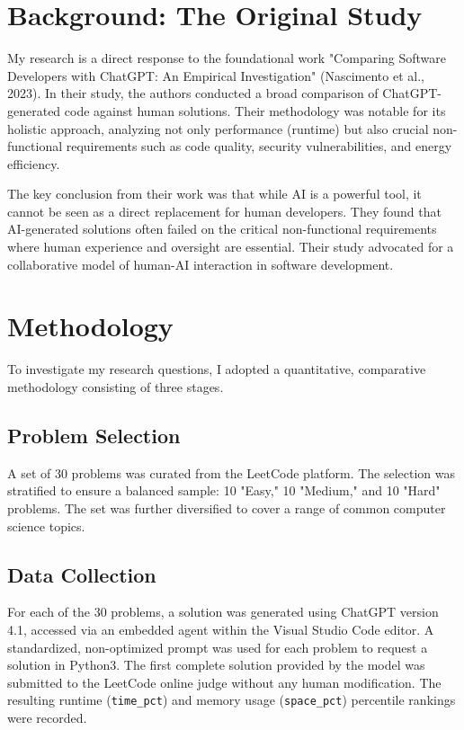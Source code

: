 \documentclass[12pt, a4paper]{article}
\begin{document}
\section{Background: The Original Study}

My research is a direct response to the foundational work "Comparing Software Developers with ChatGPT: An Empirical Investigation" (Nascimento et al., 2023). In their study, the authors conducted a broad comparison of ChatGPT-generated code against human solutions. Their methodology was notable for its holistic approach, analyzing not only performance (runtime) but also crucial non-functional requirements such as code quality, security vulnerabilities, and energy efficiency.

The key conclusion from their work was that while AI is a powerful tool, it cannot be seen as a direct replacement for human developers. They found that AI-generated solutions often failed on the critical non-functional requirements where human experience and oversight are essential. Their study advocated for a collaborative model of human-AI interaction in software development.

\section{Methodology}

To investigate my research questions, I adopted a quantitative, comparative methodology consisting of three stages.

\subsection{Problem Selection}
A set of 30 problems was curated from the LeetCode platform. The selection was stratified to ensure a balanced sample: 10 "Easy," 10 "Medium," and 10 "Hard" problems. The set was further diversified to cover a range of common computer science topics.

\subsection{Data Collection}
For each of the 30 problems, a solution was generated using ChatGPT version 4.1, accessed via an embedded agent within the Visual Studio Code editor. A standardized, non-optimized prompt was used for each problem to request a solution in Python3. The first complete solution provided by the model was submitted to the LeetCode online judge without any human modification. The resulting runtime (\texttt{time\_pct}) and memory usage (\texttt{space\_pct}) percentile rankings were recorded.
\end{document}
